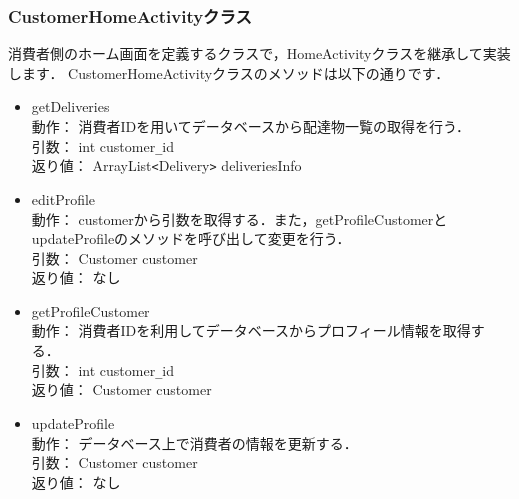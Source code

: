 \documentclass[a4j,titlepage]{jarticle}
\begin{document}
\subsubsection{CustomerHomeActivityクラス}
消費者側のホーム画面を定義するクラスで，HomeActivityクラスを継承して実装します．
CustomerHomeActivityクラスのメソッドは以下の通りです．
  \begin{itemize}
  \item getDeliveries\\
  動作：  消費者IDを用いてデータベースから配達物一覧の取得を行う．\\
  引数：  int customer\verb|_|id\\
  返り値：  ArrayList\verb|<|Delivery\verb|>| deliveriesInfo

  \item editProfile\\
  動作：  customerから引数を取得する．また，getProfileCustomerとupdateProfileのメソッドを呼び出して変更を行う．\\
  引数：  Customer customer\\
  返り値：  なし

  \item getProfileCustomer\\
  動作：  消費者IDを利用してデータベースからプロフィール情報を取得する．\\
  引数：  int customer\verb|_|id\\
  返り値：  Customer customer

  \item updateProfile\\
  動作：  データベース上で消費者の情報を更新する．\\
  引数：  Customer customer\\
  返り値：  なし
\end{itemize}
\end{document}
